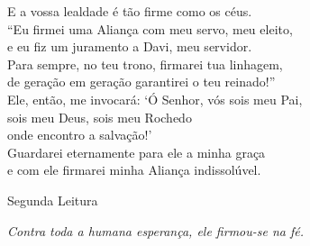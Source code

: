 \documentclass{book}
\begin{document}
\begin{flushleft}
    E a vossa lealdade é tão firme como os céus.
    \vspace{.2cm} \\
    ``Eu firmei uma Aliança com meu servo, meu eleito, \textsuperscript{\gresixstar{}} \\
    e eu fiz um juramento a Davi, meu servidor. \\
    Para sempre, no teu trono, firmarei tua linhagem, \textsuperscript{\gresixstar{}} \\
    de geração em geração garantirei o teu reinado!''
    \vspace{.2cm} \\
    Ele, então, me invocará: `Ó Senhor, vós sois meu Pai, \textsuperscript{\gresixstar{}} \\
    sois meu Deus, sois meu Rochedo  \\
    onde encontro a salvação!' \\
    Guardarei eternamente para ele a minha graça \textsuperscript{\gresixstar{}} \\
    e com ele firmarei minha Aliança indissolúvel.
    \vspace{.2cm} \\
\end{flushleft}
\begin{center}
    \textcolor{VioletRed2}{Segunda Leitura}
\end{center}
\begin{flushright}
    \textit{Contra toda a humana esperança, ele firmou-se na fé.}
\end{flushright}
\end{document}
